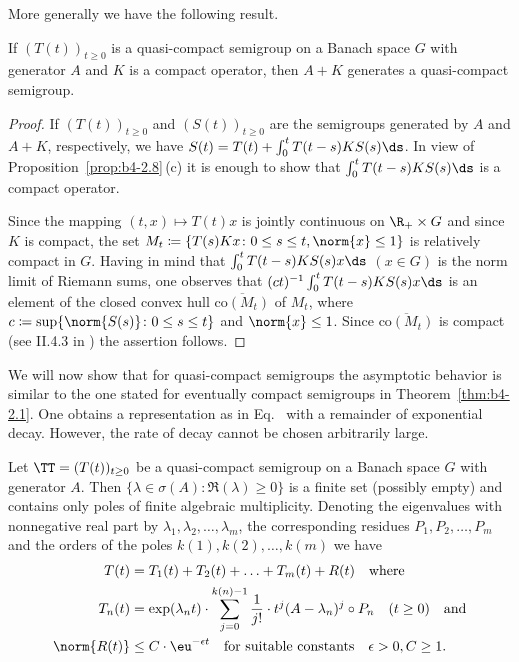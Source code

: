 More generally we have the following result.
\begin{proposition}\label{prop:b4-2.9}
    If\/ $(T(t))_{t \geq 0}$ is a quasi-compact semigroup on a Banach space $G$ with generator $A$ and $K$ is a compact operator, then $A + K$ generates a quasi-compact semigroup.
\end{proposition}
\begin{proof}
	If\/ $(T(t))_{t \geq 0}$ and $(S(t))_{t \geq 0}$ are the semigroups generated by $A$ and $A + K$, respectively, we have $S(t) = T(t) + \int_0^t T(t-s)KS(s)  \ds $.
	In view of Proposition~\ref{prop:b4-2.8}\,(c) it is enough to show that $\int_0^t T(t-s)KS(s)  \ds $ is a compact operator.
	
	Since the mapping $(t,x) \mapsto T(t)x$ is jointly continuous on $\R_+ \times G$ and since $K$ is compact, the set $M_t \coloneq \{T(s)Kx \colon 0 \leq s \leq t, \norm{x} \leq 1\}$ is relatively compact in $G$. Having in mind that $\int_0^t T(t-s)KS(s)x  \ds $ $(x \in G)$ is the norm limit of Riemann sums, one observes that 
	$(ct)^{-1}\int_0^t T(t-s)KS(s)x  \ds $ is an element of the closed convex hull
	 $\overline{\mathrm{co}(M_t)}$ of\/ $M_t$, where $c \coloneq \sup \{\norm{S(s)} \colon 0 \leq s \leq t\}$ and $\norm{x} \leq 1$. Since $\overline{\mathrm{co}(M_t)}$ is compact (see II.4.3 in \textcite{schaefer:1966}) the assertion follows.
\end{proof}
We will now show that for quasi-compact semigroups the asymptotic behavior is similar to the one stated for eventually compact semigroups in Theorem~\ref{thm:b4-2.1}. 
One obtains a representation as in Eq.~ with a remainder of exponential decay. 
However, the rate of decay cannot be chosen arbitrarily large.
\begin{theorem}\label{thm:b4-2.10}
	Let $\TT = (T(t))_{t \geq 0}$ be a quasi-compact semigroup on a Banach space $G$ with generator $A$. 
    Then $\{\lambda \in \sigma(A) \colon \Re(\lambda) \geq 0\}$ is a finite set (possibly empty) and contains only poles of finite algebraic multiplicity. 
    Denoting the eigenvalues with nonnegative real part by $\lambda_1,\lambda_2, \ldots ,\lambda_m$, the corresponding residues $P_1,P_2, \ldots ,P_m$ and the orders of the poles $k(1),k(2), \ldots, k(m)$ we have
	\begin{equation}\label{eq:b4-2.5}
		\begin{aligned}
		T(t) &= T_1(t) + T_2(t) + \ldots + T_m(t) + R(t) \quad \text{where}\\
		T_n(t) &= \exp(\lambda_nt) \cdot \sum_{j=0}^{k(n)-1} \frac{1}{j!} \cdot t^j (A - \lambda_n)^j \circ P_n \quad (t \geq 0) \quad \text{and}\\
		\norm{R(t)} &\leq C \cdot \eu^{-\epsilon t} \quad \text{for suitable constants} \quad \epsilon > 0, C \geq 1 .		
		\end{aligned}
	\end{equation}
\end{theorem}
